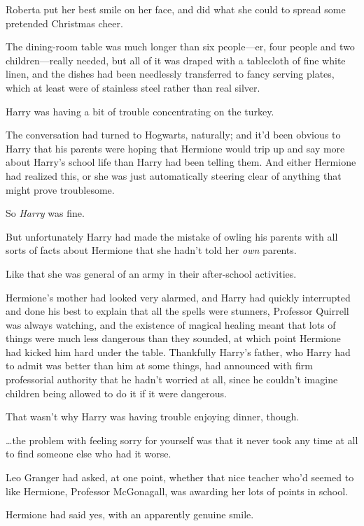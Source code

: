 Roberta put her best smile on her face, and did what she could to spread some pretended Christmas cheer.

\later

The dining-room table was much longer than six people—er, four people and two children—really needed, but all of it was draped with a tablecloth of fine white linen, and the dishes had been needlessly transferred to fancy serving plates, which at least were of stainless steel rather than real silver.

Harry was having a bit of trouble concentrating on the turkey.

The conversation had turned to Hogwarts, naturally; and it'd been obvious to Harry that his parents were hoping that Hermione would trip up and say more about Harry's school life than Harry had been telling them. And either Hermione had realized this, or she was just automatically steering clear of anything that might prove troublesome.

So \emph{Harry} was fine.

But unfortunately Harry had made the mistake of owling his parents with all sorts of facts about Hermione that she hadn't told her \emph{own} parents.

Like that she was general of an army in their after-school activities.

Hermione's mother had looked very alarmed, and Harry had quickly interrupted and done his best to explain that all the spells were stunners, Professor Quirrell was always watching, and the existence of magical healing meant that lots of things were much less dangerous than they sounded, at which point Hermione had kicked him hard under the table. Thankfully Harry's father, who Harry had to admit was better than him at some things, had announced with firm professorial authority that he hadn't worried at all, since he couldn't imagine children being allowed to do it if it were dangerous.

That wasn't why Harry was having trouble enjoying dinner, though.

{\ldots}the problem with feeling sorry for yourself was that it never took any time at all to find someone else who had it worse.

Leo Granger had asked, at one point, whether that nice teacher who'd seemed to like Hermione, Professor McGonagall, was awarding her lots of points in school.

Hermione had said yes, with an apparently genuine smile.

